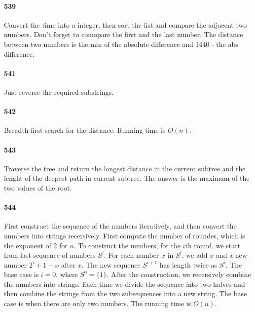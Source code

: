 \documentclass[11pt]{article}
\begin{document}
\paragraph{539}
Convert the time into a integer, then sort the list and compare the adjacent two numbers. Don't forget to comopare the first
and the last number. The distance between two numbers is the min of the absolute difference and 1440 - the abs difference.

\paragraph{541}
Just reverse the required substrings.

\paragraph{542}
Breadth first search for the distance. Running time is $O(n)$.

\paragraph{543}
Traverse the tree and return the longest distance in the current subtree and the lenght of the deepest path in current subtree. The answer is the maximum of the two values of the root.

\paragraph{544}
First construct the sequence of the numbers iteratively, and then convert the numbers into strings recersively.
First compute the number of roundes, which is the exponent of 2 for $n$. To construct the numbers, for the $i$th round, we start from last sequence of numbers $S^i$. For each number $x$ in $S^i$, we add $x$ and a new number $2^i+1 - x$ after $x$.
The new sequence $S^{i+1}$ has length twice as $S^i$. The base case is $i = 0$, where $S^0 = \{ 1 \}$.
After the construction, we recersively combine the numbers into strings. Each time we divide the sequence into two halves 
and then combine the strings from the two subsequences into a new string. The base case is when there are only two numbers.
The running time is $O(n)$.
\end{document}
